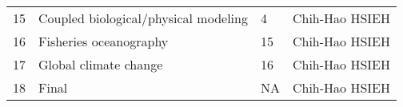 \documentclass[
]{article}
\begin{document}
\begin{longtable}[]{@{}llll@{}}
\begin{minipage}[t]{0.13\columnwidth}
15\strut
\end{minipage} & \begin{minipage}[t]{0.23\columnwidth}\raggedright
Coupled biological/physical modeling\strut
\end{minipage} & \begin{minipage}[t]{0.23\columnwidth}\raggedright
4\strut
\end{minipage} & \begin{minipage}[t]{0.30\columnwidth}\raggedright
Chih-Hao HSIEH\strut
\end{minipage}\tabularnewline
\begin{minipage}[t]{0.13\columnwidth}\raggedright
16\strut
\end{minipage} & \begin{minipage}[t]{0.23\columnwidth}\raggedright
Fisheries oceanography\strut
\end{minipage} & \begin{minipage}[t]{0.23\columnwidth}\raggedright
15\strut
\end{minipage} & \begin{minipage}[t]{0.30\columnwidth}\raggedright
Chih-Hao HSIEH\strut
\end{minipage}\tabularnewline
\begin{minipage}[t]{0.13\columnwidth}\raggedright
17\strut
\end{minipage} & \begin{minipage}[t]{0.23\columnwidth}\raggedright
Global climate change\strut
\end{minipage} & \begin{minipage}[t]{0.23\columnwidth}\raggedright
16\strut
\end{minipage} & \begin{minipage}[t]{0.30\columnwidth}\raggedright
Chih-Hao HSIEH\strut
\end{minipage}\tabularnewline
\begin{minipage}[t]{0.13\columnwidth}\raggedright
18\strut
\end{minipage} & \begin{minipage}[t]{0.23\columnwidth}\raggedright
Final\strut
\end{minipage} & \begin{minipage}[t]{0.23\columnwidth}\raggedright
NA\strut
\end{minipage} & \begin{minipage}[t]{0.30\columnwidth}\raggedright
Chih-Hao HSIEH\strut
\end{minipage}\tabularnewline
\bottomrule
\end{longtable}
\end{document}
